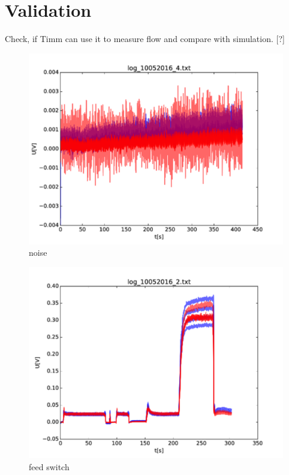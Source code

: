 \section{Validation}

Check, if Timm can use it to measure flow and compare with simulation. [?]

\begin{figure}
	\begin{center}
		\includegraphics[width=\textwidth]{images/noise.pdf} 
		\caption{noise}
	\end{center}
\end{figure}

\begin{figure}
	\begin{center}
		\includegraphics[width=\textwidth]{images/feed_switch.pdf} 
		\caption{feed switch}
	\end{center}
\end{figure}

